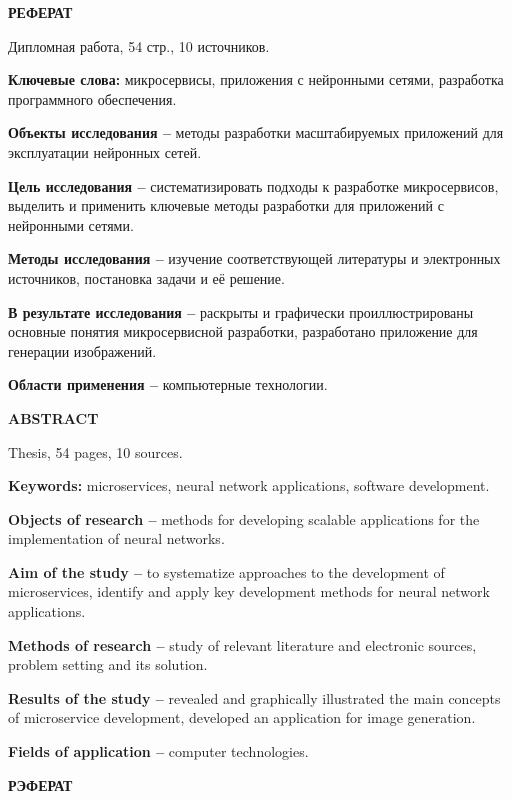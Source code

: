 \begin{center}
  \large\bfseries{РЕФЕРАТ}
\end{center}

Дипломная работа, 54 стр., 10 источников.

\textbf{Ключевые слова:} микросервисы, приложения с нейронными сетями, разработка программного обеспечения.

\textbf{Объекты исследования --} методы разработки масштабируемых приложений для эксплуатации нейронных сетей.

\textbf{Цель исследования --} систематизировать подходы к разработке микросервисов, выделить и применить ключевые методы разработки для приложений с нейронными сетями.

\textbf{Методы исследования --} изучение соответствующей литературы и электронных источников, постановка задачи и её решение.

\textbf{В результате исследования --} раскрыты и графически проиллюстрированы основные понятия микросервисной разработки, разработано приложение для генерации изображений.

\textbf{Области применения --} компьютерные технологии.

\newpage

\begin{center}
  \large\bfseries{ABSTRACT}
\end{center}

Thesis, 54 pages, 10 sources.

\textbf{Keywords:} microservices, neural network applications, software development.

\textbf{Objects of research --} methods for developing scalable applications for the implementation of neural networks.

\textbf{Aim of the study --} to systematize approaches to the development of microservices, identify and apply key development methods for neural network applications.

\textbf{Methods of research --} study of relevant literature and electronic sources, problem setting and its solution.

\textbf{Results of the study --} revealed and graphically illustrated the main concepts of microservice development, developed an application for image generation.

\textbf{Fields of application --} computer technologies.

\newpage

\begin{center}
  \large\bfseries{РЭФЕРАТ}
\end{center}


